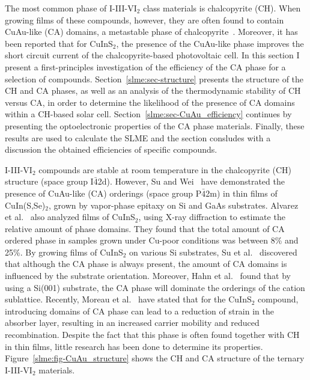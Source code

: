 \begin{refsection}
The most common phase of I-III-VI$_2$ class materials is chalcopyrite (\gls{CH}). When 
growing films of these compounds, however, they are often found to contain 
CuAu-like (CA) domains, a metastable phase of chalcopyrite~\cite{Su1999}. Moreover, it has been 
reported that for CuInS$_2$, the presence of the CuAu-like phase improves the 
short circuit current of the chalcopyrite-based photovoltaic cell. In this 
section I present a first-principles investigation of the efficiency of the \gls{CA} 
phase for a selection of compounds. Section~\ref{slme:sec-structure} presents 
the structure of the \gls{CH} and \gls{CA} phases, as well as an analysis of the thermodynamic 
stability of \gls{CH} versus \gls{CA}, in order to determine the likelihood of the presence of \gls{CA} domains 
within a \gls{CH}-based solar cell. Section~\ref{slme:sec-CuAu_efficiency} continues by presenting the optoelectronic 
properties of the \gls{CA} phase materials. Finally, these results are used to calculate 
the \gls{SLME} and the section consludes with a discussion the obtained efficiencies of specific compounds.  
 
 
I-III-VI$_2$ compounds are stable at room temperature in the chalcopyrite (\gls{CH}) 
structure (space group I$\bar{4}$2d). However, Su and Wei~\cite{Su1999} have 
demonstrated the presence of CuAu-like (CA) orderings (space group 
P$\bar{4}$2m) in thin films of CuIn(S,Se)$_2$, grown by vapor-phase epitaxy on 
Si and GaAs substrates.  Alvarez et al.~\cite{Alvarez2002} also analyzed films 
of CuInS$_2$, using X-ray diffraction to estimate the relative amount of phase domains. They 
found that the total amount of \gls{CA} ordered phase in samples grown under Cu-poor 
conditions was between 8\% and 25\%. By growing films of CuInS$_2$ on various 
Si substrates, Su et al.~\cite{Su2000} discovered that although the \gls{CA} phase 
is always present, the amount of \gls{CA} domains is influenced by the substrate 
orientation. Moreover, Hahn et al.~\cite{Hahn2001} found that by using a 
Si(001) substrate, the \gls{CA} phase will dominate the orderings of the cation 
sublattice. Recently, Moreau et al.~\cite{Moreau2015} have stated that for the 
CuInS$_2$ compound, introducing domains of \gls{CA} phase can lead to a reduction of 
strain in the absorber layer, resulting in an increased carrier mobility and 
reduced recombination. Despite the fact that this phase is often found 
together with \gls{CH} in thin films, little research has been done to determine its 
properties. Figure~\ref{slme:fig-CuAu_structure} shows the \gls{CH} and \gls{CA} structure 
of the ternary I-III-VI$_2$ materials. 
 

\end{refsection}
